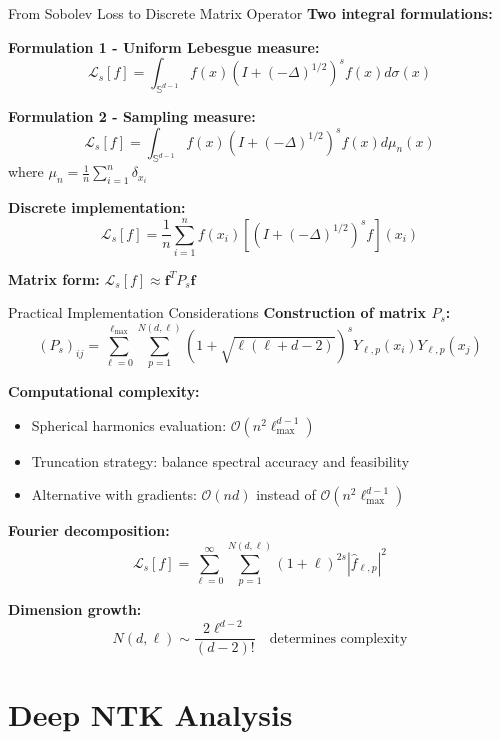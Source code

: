 \documentclass{beamer}
\begin{document}
\begin{frame}{From Sobolev Loss to Discrete Matrix Operator}
\textbf{Two integral formulations:}

\textbf{Formulation 1 - Uniform Lebesgue measure:}
\[ \mathcal{L}_s[f] = \int_{\mathbb{S}^{d-1}} f(x) (I + (-\Delta)^{1/2})^s f(x) d\sigma(x) \]

\textbf{Formulation 2 - Sampling measure:}
\[ \mathcal{L}_s[f] = \int_{\mathbb{S}^{d-1}} f(x) (I + (-\Delta)^{1/2})^s f(x) d\mu_n(x) \]
where $\mu_n = \frac{1}{n}\sum_{i=1}^n \delta_{x_i}$

\textbf{Discrete implementation:}
\[ \mathcal{L}_s[f] = \frac{1}{n}\sum_{i=1}^n f(x_i) \left[(I + (-\Delta)^{1/2})^s f\right](x_i) \]

\textbf{Matrix form:} $\mathcal{L}_s[f] \approx \mathbf{f}^T P_s \mathbf{f}$
\end{frame}

\begin{frame}{Practical Implementation Considerations}
\textbf{Construction of matrix $P_s$:}
\[ (P_s)_{ij} = \sum_{\ell=0}^{\ell_{\max}} \sum_{p=1}^{N(d,\ell)} (1 + \sqrt{\ell(\ell + d - 2)})^s Y_{\ell,p}(x_i) Y_{\ell,p}(x_j) \]

\textbf{Computational complexity:}
\begin{itemize}
\item Spherical harmonics evaluation: $\mathcal{O}(n^2 \ell_{\max}^{d-1})$
\item Truncation strategy: balance spectral accuracy and feasibility
\item Alternative with gradients: $\mathcal{O}(nd)$ instead of $\mathcal{O}(n^2\ell_{\max}^{d-1})$
\end{itemize}

\textbf{Fourier decomposition:}
\[ \mathcal{L}_s[f] = \sum_{\ell=0}^{\infty} \sum_{p=1}^{N(d,\ell)} (1+\ell)^{2s} |\hat{f}_{\ell,p}|^2 \]

\textbf{Dimension growth:}
\[ N(d,\ell) \sim \frac{2\ell^{d-2}}{(d-2)!} \quad \text{determines complexity} \]
\end{frame}

\section{Deep NTK Analysis}
\end{document}
